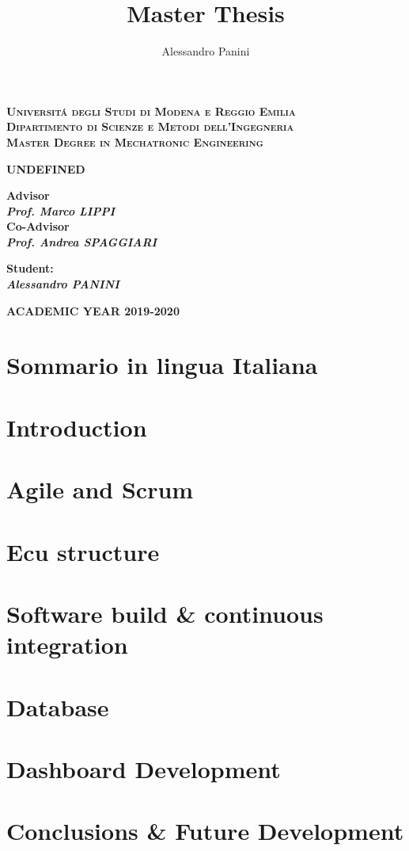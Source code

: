 \documentclass[a4paper,12pt,twoside]{report}
\title{\textbf{Master Thesis}}
\date{}
\author{Alessandro Panini}
\newlength{\drop}%
\newcommand*{\titleSal}%
{
	\begin{center}  
		\begingroup
		{\Large\bfseries\rmfamily\scshape Universit\'a degli Studi di Modena e Reggio Emilia}\\
		{\Large\bfseries\rmfamily\scshape Dipartimento di Scienze e Metodi dell'Ingegneria }\\[\baselineskip]
		\vspace*{1cm}
		\vspace*{\drop}
		{\Large\bfseries\rmfamily\scshape Master Degree in Mechatronic Engineering}\\[\baselineskip]
		\vspace*{\drop}
		
		\vspace*{3cm}
		
		\linespread{3}
        {\LARGE\bfseries\rmfamily UNDEFINED}\\
		\vspace*{4cm}
		
	\end{center}
	\vspace*{2cm}   
	\begin{minipage}[t]{0.5\textwidth}
		\begin{flushleft}
			{\small\bfseries Advisor}\\
			{\bfseries\itshape Prof. Marco LIPPI }\\
			{\small\bfseries Co-Advisor}\\
			{\bfseries\itshape Prof. Andrea SPAGGIARI}
		\end{flushleft}
	\end{minipage}
	\begin{minipage}[t]{0.4\textwidth}
		\begin{flushright} 
			{\bfseries\small Student:}\\
			{\bfseries\itshape Alessandro PANINI}
		\end{flushright}
	\end{minipage}  
	\vfill
	
	{\large\bfseries\rmfamily ACADEMIC YEAR 2019-2020}
	
	\endgroup
}
\begin{document}
	
\titleSal
\pagestyle{plain}

\newcommand*\rot{\multicolumn{1}{R{45}{1em}}}

	
	\newpage
	
	
	\tableofcontents
	\cleardoublepage


\chapter*{}



\chapter*{Sommario in lingua Italiana}

	

\chapter{Introduction}



\chapter{Agile and Scrum}
	

\chapter{Ecu structure}
	

\chapter{Software build \& continuous integration}
	

% 	

\chapter{Database}



\chapter{Dashboard Development}



\chapter{Conclusions \& Future Development}



\cleardoublepage




\listoffigures
\end{document}

